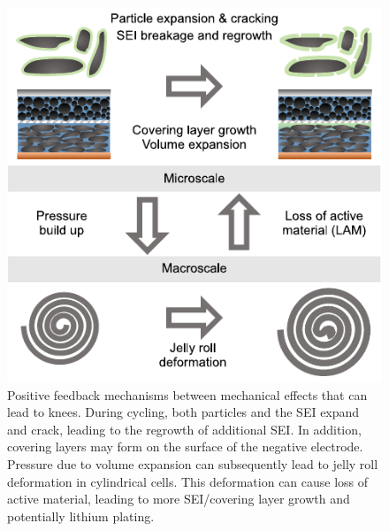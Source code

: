 \documentclass[journal=jpclcd,manuscript=article]{achemso}
\begin{document}
\begin{figure}[hp]
\centering
\includegraphics[scale = 1]{final_figures/mechanical.pdf}
\caption{Positive feedback mechanisms between mechanical effects that can lead to knees. During cycling, both particles and the SEI expand and crack, leading to the regrowth of additional SEI. In addition, covering layers may form on the surface of the negative electrode. Pressure due to volume expansion can subsequently lead to jelly roll deformation in cylindrical cells. This deformation can cause loss of active material, leading to more SEI/covering layer growth and potentially lithium plating.}
\label{fig:knee_mechanical}
\end{figure}
\end{document}
